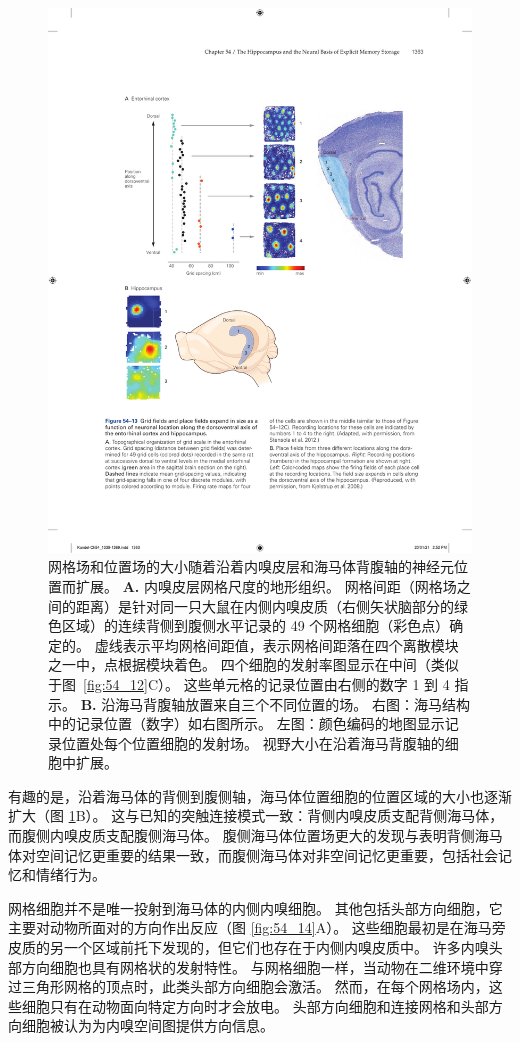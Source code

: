 \begin{figure}[htbp]
	\centering
	\includegraphics[width=0.8\linewidth]{chap54/fig_54_13}
	\caption{网格场和位置场的大小随着沿着内嗅皮层和海马体背腹轴的神经元位置而扩展。
		\textbf{A.} 内嗅皮层网格尺度的地形组织。
		网格间距（网格场之间的距离）是针对同一只大鼠在内侧内嗅皮质（右侧矢状脑部分的绿色区域）的连续背侧到腹侧水平记录的 49 个网格细胞（彩色点）确定的。
		虚线表示平均网格间距值，表示网格间距落在四个离散模块之一中，点根据模块着色。
		四个细胞的发射率图显示在中间（类似于图~\ref{fig:54_12}C）。
		这些单元格的记录位置由右侧的数字 1 到 4 指示\cite{stensola2012entorhinal}。
		\textbf{B.} 沿海马背腹轴放置来自三个不同位置的场。
		右图：海马结构中的记录位置（数字）如右图所示。
		左图：颜色编码的地图显示记录位置处每个位置细胞的发射场。
		视野大小在沿着海马背腹轴的细胞中扩展\cite{kjelstrup2008finite}。}
	\label{fig:54_13}
\end{figure}


有趣的是，沿着海马体的背侧到腹侧轴，海马体位置细胞的位置区域的大小也逐渐扩大（图 \ref{fig:54_13}B）。
这与已知的突触连接模式一致：背侧内嗅皮质支配背侧海马体，而腹侧内嗅皮质支配腹侧海马体。
腹侧海马体位置场更大的发现与表明背侧海马体对空间记忆更重要的结果一致，而腹侧海马体对非空间记忆更重要，包括社会记忆和情绪行为。


网格细胞并不是唯一投射到海马体的内侧内嗅细胞。
其他包括头部方向细胞，它主要对动物所面对的方向作出反应（图 \ref{fig:54_14}A）。
这些细胞最初是在海马旁皮质的另一个区域前托下发现的，但它们也存在于内侧内嗅皮质中。
许多内嗅头部方向细胞也具有网格状的发射特性。
与网格细胞一样，当动物在二维环境中穿过三角形网格的顶点时，此类头部方向细胞会激活。
然而，在每个网格场内，这些细胞只有在动物面向特定方向时才会放电。
头部方向细胞和连接网格和头部方向细胞被认为为内嗅空间图提供方向信息。


